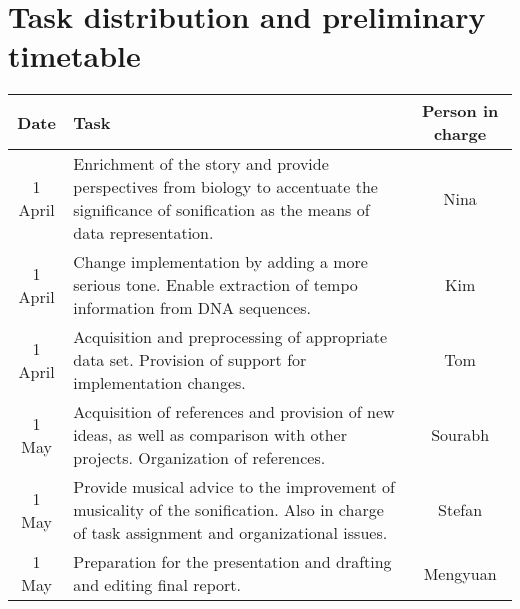 \documentclass[10pt]{article}
\begin{document}
\section{Task distribution and preliminary timetable}
\begin{center}
    \begin{tabular}{ | c | p{7 cm} | c  |}
    \hline
    Date & Task  & Person in charge \\ \hline
    1 April & Enrichment of the story and provide perspectives from biology to accentuate the significance of sonification as the means of data representation. & Nina \\ \hline
    1 April &  Change implementation by adding a more serious tone. Enable extraction of tempo information from DNA sequences.  & Kim \\ \hline
    1 April & Acquisition and preprocessing of appropriate data set. Provision of support for implementation changes.              & Tom \\ \hline
    1 May & Acquisition of references and provision of new ideas, as well as comparison with other projects. Organization of references.                                               & Sourabh \\ \hline
    1 May & Provide musical advice to the improvement of musicality of the sonification. Also in charge of task assignment and organizational issues. & Stefan  \\ \hline
     1 May & Preparation for the presentation and drafting and editing final report.        & Mengyuan \\ \hline
    
    \hline
    \end{tabular}
\end{center}

\newpage
\clearpage
\pagestyle{empty}

\nocite{*}
\doublespacing
\printbibliography
\end{document}
